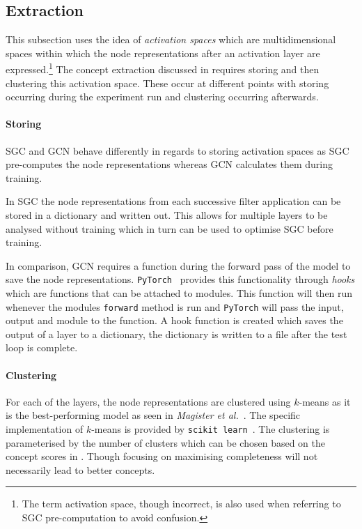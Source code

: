 \subsection{Extraction}
\label{sec:extraction}

This subsection uses the idea of \emph{activation spaces} which are multidimensional spaces within which the node representations after an activation layer are expressed.\footnote{The term activation space, though incorrect, is also used when referring to SGC pre-computation to avoid confusion.}
The concept extraction discussed in  requires storing and then clustering this activation space.
These occur at different points with storing occurring during the experiment run and clustering occurring afterwards.

\paragraph{Storing}
SGC and GCN behave differently in regards to storing activation spaces as SGC pre-computes the node representations whereas GCN calculates them during training.

In SGC the node representations from each successive filter application can be stored in a dictionary and written out.
This allows for multiple layers to be analysed without training which in turn can be used to optimise SGC before training.

In comparison, GCN requires a function during the forward pass of the model to save the node representations.
\texttt{PyTorch}~\cite{paszke2019pytorch} provides this functionality through \emph{hooks} which are functions that can be attached to modules.
This function will then run whenever the modules \texttt{forward} method is run and \texttt{PyTorch} will pass the input, output and module to the function.
A hook function is created which saves the output of a layer to a dictionary, the dictionary is written to a file after the test loop is complete.

\paragraph{Clustering}
For each of the layers, the node representations are clustered using $k$-means as it is the best-performing model as seen in \textit{Magister et al.}~\cite{magister2021gcexplainer}.
The specific implementation of $k$-means is provided by
\texttt{scikit learn}~\cite{scikit-learn}.
The clustering is parameterised by the number of clusters which
can be chosen based on the concept scores in .
Though focusing on maximising completeness will not necessarily lead to better concepts.

